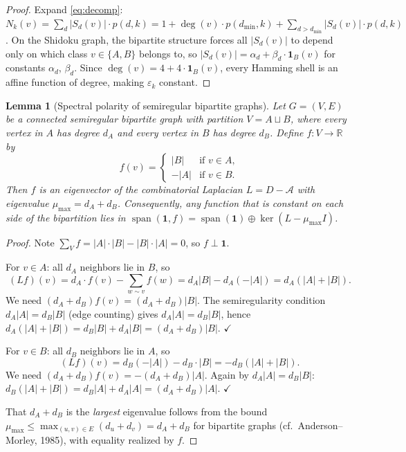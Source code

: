 \documentclass[11pt]{article}
\newtheorem{lemma}[theorem]{Lemma}
\theoremstyle{definition}
\theoremstyle{remark}
\begin{document}
\begin{proof}
Expand \eqref{eq:decomp}: $N_k(v) = \sum_d |S_d(v)| \cdot p(d,k) = 1 + \deg(v) \cdot p(d_{\min}, k) + \sum_{d > d_{\min}} |S_d(v)| \cdot p(d,k)$. On the Shidoku graph, the bipartite structure forces all $|S_d(v)|$ to depend only on which class $v \in \{A, B\}$ belongs to, so $|S_d(v)| = \alpha_d + \beta_d \cdot \mathbf{1}_B(v)$ for constants $\alpha_d$, $\beta_d$. Since $\deg(v) = 4 + 4 \cdot \mathbf{1}_B(v)$, every Hamming shell is an affine function of degree, making $\varepsilon_k$ constant.
\end{proof}

\begin{lemma}[Spectral polarity of semiregular bipartite graphs]\label{lem:spectral_polarity}
Let $G = (V, E)$ be a connected semiregular bipartite graph with partition $V = A \sqcup B$, where every vertex in $A$ has degree $d_A$ and every vertex in $B$ has degree $d_B$. Define $f \colon V \to \mathbb{R}$ by
\[
f(v) = \begin{cases} |B| & \text{if } v \in A, \\ -|A| & \text{if } v \in B. \end{cases}
\]
Then $f$ is an eigenvector of the combinatorial Laplacian $L = D - \mathcal{A}$ with eigenvalue $\mu_{\max} = d_A + d_B$. Consequently, any function that is constant on each side of the bipartition lies in $\operatorname{span}(\mathbf{1}, f) = \operatorname{span}(\mathbf{1}) \oplus \ker(L - \mu_{\max} I)$.
\end{lemma}

\begin{proof}
Note $\sum_V f = |A| \cdot |B| - |B| \cdot |A| = 0$, so $f \perp \mathbf{1}$.

For $v \in A$: all $d_A$ neighbors lie in $B$, so
\[
(Lf)(v) = d_A \cdot f(v) - \sum_{w \sim v} f(w) = d_A |B| - d_A(-|A|) = d_A(|A| + |B|).
\]
We need $(d_A + d_B)f(v) = (d_A + d_B)|B|$.  The semiregularity condition $d_A |A| = d_B |B|$ (edge counting) gives $d_A |A| = d_B |B|$, hence $d_A(|A| + |B|) = d_B |B| + d_A |B| = (d_A + d_B)|B|$. $\checkmark$

For $v \in B$: all $d_B$ neighbors lie in $A$, so
\[
(Lf)(v) = d_B(-|A|) - d_B \cdot |B| = -d_B(|A| + |B|).
\]
We need $(d_A + d_B)f(v) = -(d_A + d_B)|A|$. Again by $d_A |A| = d_B |B|$: $d_B(|A| + |B|) = d_B |A| + d_A |A| = (d_A + d_B)|A|$. $\checkmark$

That $d_A + d_B$ is the \emph{largest} eigenvalue follows from the bound $\mu_{\max} \le \max_{(u,v) \in E}(d_u + d_v) = d_A + d_B$ for bipartite graphs (cf.\ Anderson--Morley, 1985), with equality realized by $f$.
\end{proof}
\end{document}
